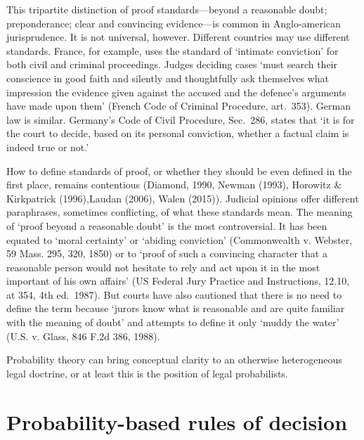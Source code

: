 \documentclass[10pt,dvipsnames]{scrartcl}
\begin{document}
This tripartite distinction of proof standards---beyond a reasonable
doubt; preponderance; clear and convincing evidence---is common in
Anglo-american jurisprudence. It is not universal, however. Different
countries may use different standards. France, for example, uses the
standard of `intimate conviction' for both civil and criminal
proceedings. Judges deciding cases `must search their conscience in good
faith and silently and thoughtfully ask themselves what impression the
evidence given against the accused and the defence's arguments have made
upon them' (French Code of Criminal Procedure, art.~353). German law is
similar. Germany's Code of Civil Procedure, Sec.~286, states that `it is
for the court to decide, based on its personal conviction, whether a
factual claim is indeed true or not.'

How to define standards of proof, or whether they should be even defined
in the first place, remains contentious (Diamond, 1990, Newman (1993),
Horowitz \& Kirkpatrick (1996),Laudan (2006), Walen (2015)). Judicial
opinions offer different paraphrases, sometimes conflicting, of what
these standards mean. The meaning of `proof beyond a reasonable doubt'
is the most controversial. It has been equated to `moral certainty' or
`abiding conviction' (Commonwealth v. Webster, 59 Mass. 295, 320, 1850)
or to `proof of such a convincing character that a reasonable person
would not hesitate to rely and act upon it in the most important of his
own affairs' (US Federal Jury Practice and Instructions, 12.10, at 354,
4th ed.~1987). But courts have also cautioned that there is no need to
define the term because `jurors know what is reasonable and are quite
familiar with the meaning of doubt' and attempts to define it only
`muddy the water' (U.S. v. Glass, 846 F.2d 386, 1988).

Probability theory can bring conceptual clarity to an otherwise
heterogeneous legal doctrine, or at least this is the position of legal
probabilists.

\section{Probability-based rules of
decision}\label{probability-based-rules-of-decision}
\end{document}
